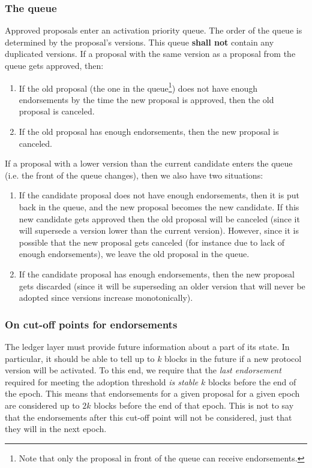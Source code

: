 \subsubsection{The queue}
\label{sec:the-queue}

Approved proposals enter an activation priority queue. The order of the queue is
determined by the proposal's versions. This queue \textbf{shall not} contain any
duplicated versions. If a proposal with the same version as a proposal from the
queue gets approved, then:

\begin{enumerate}
	\item If the old proposal (the one in the queue\footnote{Note that only the
		proposal in front of the queue can receive endorsements.}) does not have
	enough endorsements by the time the new proposal is approved, then the old
	proposal is canceled.
	\item If the old proposal has enough endorsements, then the new proposal is
	canceled.
\end{enumerate}


If a proposal with a lower version than the current candidate enters the queue
(i.e. the front of the queue changes), then we also have two situations:

\begin{enumerate}
	\item If the candidate proposal does not have enough endorsements, then it 
	is
	put back in the queue, and the new proposal becomes the new candidate. If 
	this
	new candidate gets approved then the old proposal will be canceled (since it
	will supersede a version lower than the current version). However, since it 
	is
	possible that the new proposal gets canceled (for instance due to lack of
	enough endorsements), we leave the old proposal in the queue.
	\item If the candidate proposal has enough endorsements, then the new 
	proposal
	gets discarded (since it will be superseding an older version that will 
	never
	be adopted since versions increase monotonically).
\end{enumerate}

\subsubsection{On cut-off points for endorsements}
\label{sec:on-cutoff-points-for-endorsements}

The ledger layer must provide future information about a part of its state. In
particular, it should be able to tell up to $k$ blocks in the future if a
new protocol version will be activated. To this end, we require that the
\emph{last endorsement} required for meeting the adoption threshold \emph{is
	stable} $k$ blocks before the end of the epoch. This means that
endorsements for a given proposal for a given epoch are considered up to
$2k$ blocks before the end of that epoch. This is not to say that the
endorsements after this cut-off point will not be considered, just that they
will in the next epoch.

